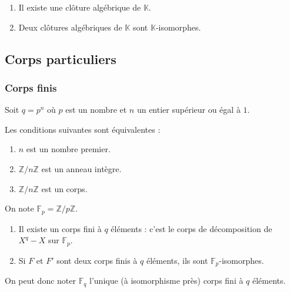   \begin{theorem}
    \begin{enumerate}[label={\bfseries(\roman*)}]
      \item Il existe une clôture algébrique de $\mathbb{K}$.
      \item Deux clôtures algébriques de $\mathbb{K}$ sont $\mathbb{K}$-isomorphes.
    \end{enumerate}
  \end{theorem}

  \subsection{Corps particuliers}

  \subsubsection{Corps finis}

  Soit $q = p^n$ où $p$ est un nombre et $n$ un entier supérieur ou égal à $1$.


  \begin{proposition}
    Les conditions suivantes sont équivalentes :
    \begin{enumerate}[label={\bfseries(\roman*)}]
      \item $n$ est un nombre premier.
      \item $\mathbb{Z}/n\mathbb{Z}$ est un anneau intègre.
      \item $\mathbb{Z}/n\mathbb{Z}$ est un corps.
    \end{enumerate}
  \end{proposition}

  \begin{notation}
    On note $\mathbb{F}_p = \mathbb{Z}/p\mathbb{Z}$.
  \end{notation}


  \begin{theorem}
    \begin{enumerate}[label={\bfseries(\roman*)}]
      \item Il existe un corps fini à $q$ éléments : c'est le corps de décomposition de $X^q - X$ sur $\mathbb{F}_p$.
      \item Si $F$ et $F'$ sont deux corps finis à $q$ éléments, ils sont $\mathbb{F}_p$-isomorphes.
    \end{enumerate}
    On peut donc noter $\mathbb{F}_q$ l'unique (à isomorphisme près) corps fini à $q$ éléments.
  \end{theorem}

